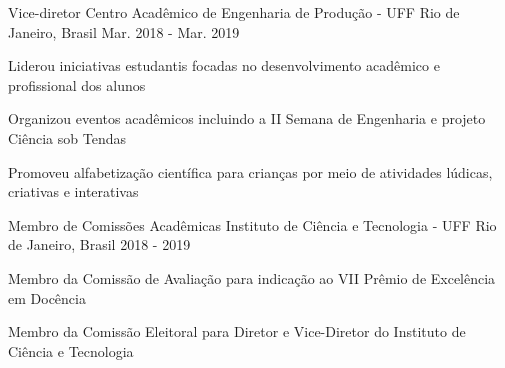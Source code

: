 

\begin{cventries}

  \cventry
    {Vice-diretor} %
    {Centro Acadêmico de Engenharia de Produção - UFF} %
    {Rio de Janeiro, Brasil} %
    {Mar. 2018 - Mar. 2019} %
    {
      \begin{cvitems} %
        \item {Liderou iniciativas estudantis focadas no desenvolvimento acadêmico e profissional dos alunos}
        \item {Organizou eventos acadêmicos incluindo a II Semana de Engenharia e projeto Ciência sob Tendas}
        \item {Promoveu alfabetização científica para crianças por meio de atividades lúdicas, criativas e interativas}
      \end{cvitems}
    }

  \cventry
    {Membro de Comissões Acadêmicas} %
    {Instituto de Ciência e Tecnologia - UFF} %
    {Rio de Janeiro, Brasil} %
    {2018 - 2019} %
    {
      \begin{cvitems} %
        \item {Membro da Comissão de Avaliação para indicação ao VII Prêmio de Excelência em Docência}
        \item {Membro da Comissão Eleitoral para Diretor e Vice-Diretor do Instituto de Ciência e Tecnologia}
      \end{cvitems}
    }

\end{cventries} 